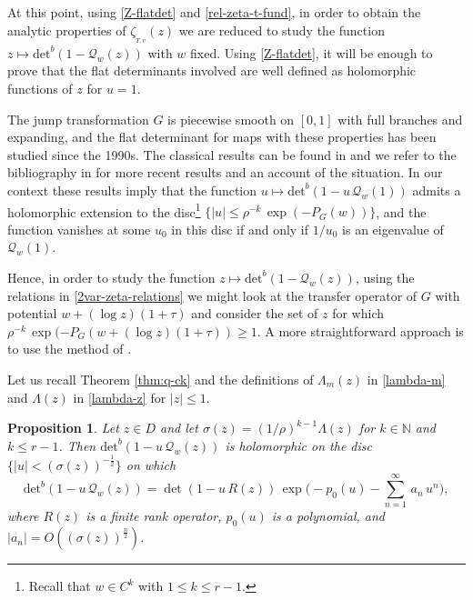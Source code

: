 \documentclass[11pt]{amsart}
\newtheorem{proposition}[theorem]{Proposition}
\theoremstyle{definition}
\theoremstyle{remark}
\theoremstyle{definition}
\numberwithin{equation}{section}
\newcommand{\N}{\mathbb N}
\newcommand{\QQ}{\mathcal{Q}}
\newcommand{\dynzeta}[1]{\zeta_{_{#1}}}
\newcommand{\flatdet}{\text{det}^b}
\begin{document}
At this point, using \eqref{Z-flatdet} and \eqref{rel-zeta-t-fund}, in order to obtain the analytic properties of $\dynzeta{T,v}(z)$ we are reduced to study the function $z\mapsto \flatdet(1-\QQ_{w}(z))$ {with $w$ fixed. Using \eqref{Z-flatdet}, it will be enough to prove that the flat determinants involved are well defined as holomorphic functions of $z$ for $u=1$.}

The jump transformation $G$ is piecewise smooth on $[0,1]$ with full branches and expanding, and the flat determinant for maps with these properties has been studied since the 1990s. The classical results can be found in \cite{ruelle, kitaev} and we refer to the bibliography in \cite[Chapter 3]{bal-book-2} for more recent results and an account of the situation. In our context these results imply that the function $u\mapsto \flatdet(1-u\, \QQ_{w}(1))$ admits a holomorphic extension to the disc\footnote{Recall that $w\in C^k$ with $1\le k\le r-1$.} $\{|u| \le \rho^{-k} \, \exp(-P_G(w))\}$, and the function vanishes at some $u_0$ in this disc if and only if $1/u_0$ is an eigenvalue of $\QQ_{w}(1)$.

Hence, in order to study the function $z\mapsto \flatdet(1-\QQ_{w}(z))$, using the relations in \eqref{2var-zeta-relations} we might look at the transfer operator of $G$ with potential $w+(\log z)(1+\tau)$ and consider the set of $z$ for which $\rho^{-k} \, \exp(-P_G(w+(\log z)(1+\tau)) \ge 1$. A more straightforward approach is to use the method of \cite{LT}.

Let us recall Theorem \ref{thm:q-ck} and the definitions of $\Lambda_m(z)$ in \eqref{lambda-m} and $\Lambda(z)$ in \eqref{lambda-z} for $|z|\le 1$.

\begin{proposition}\label{prop:lt}
Let $z\in D$ and let $\sigma(z) = (1/\rho)^{k-1} \Lambda(z)$ for $k\in \N$ and $k\le r-1$. Then $\flatdet(1-u\, \QQ_{w}(z))$ is holomorphic on the disc $\{|u| < (\sigma(z))^{-\frac 12}\}$ on which
\[
\flatdet(1-u\, \QQ_{w}(z)) = \det(1-u\, R(z))\, \exp \Big( -p_0(u) - \sum_{n=1}^\infty\, a_n\, u^n\Big),
\] 
where $R(z)$ is a finite rank operator, $p_0(u)$ is a polynomial, and $|a_n| = O((\sigma(z))^{\frac n2})$.
\end{proposition}
\end{document}

